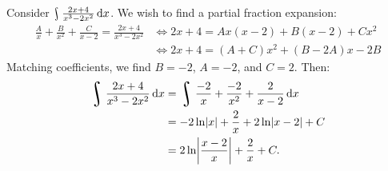 \begin{ex}
  Consider $ \rint \frac{2x + 4}{x^3 - 2x^2} \dif{x} $. We wish to find a partial fraction expansion:
  \begin{align*}
    \frac{A}{x} + \frac{B}{x^2} + \frac{C}{x-2} = \frac{2x + 4}{x^3 - 2x^2} &\iff 2x + 4 = Ax(x-2) + B(x-2) + Cx^2\\
                                                                            &\iff 2x + 4 = (A + C)x^2 + (B - 2A)x -2B
  \end{align*}
  Matching coefficients, we find $ B = -2 $, $ A = -2 $, and $ C = 2 $. Then:
  \begin{align*}
    \rint \frac{2x + 4}{x^3 - 2x^2} \dif{x} &= \rint \frac{-2}{x} + \frac{-2}{x^2} + \frac{2}{x-2} \dif{x}\\
                                            &= -2\ln \abs{x} + \frac{2}{x} + 2\ln\abs{x-2} + C\\
                                            &= 2\ln\abs{\frac{x-2}{x}} + \frac{2}{x} + C.
  \end{align*}
\end{ex}

\clearpage
